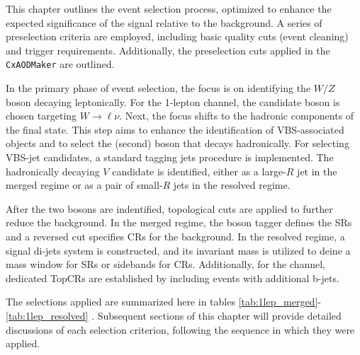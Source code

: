 

This chapter outlines the event selection process, optimized to enhance the expected significance of the signal relative to the background.
A series of preselection criteria are employed, including basic quality cuts (event cleaning) and trigger requirements. Additionally, the preselection cuts applied in the \texttt{CxAODMaker} are outlined.

In the primary phase of event selection, the focus is on identifying the $W/Z$ boson decaying leptonically. For the 1-lepton channel, the candidate boson is chosen targeting $W\to \ell\nu$.
Next, the focus shifts to the hadronic components of the final state. This step aims to enhance the identification of VBS-associated objects and to select the (second) boson that decays hadronically. For selecting VBS-jet candidates, a standard tagging jets procedure is implemented. The hadronically decaying $V$ candidate is identified, either as a large-$R$ jet in the merged regime or as a pair of small-$R$ jets in the resolved regime. 

After the two bosons are indentified, topological cuts are applied to further reduce the background. In the merged regime, the boson tagger defines the SRs and a reversed cut specifies CRs for the \Vjets background. In the resolved regime, a signal di-jets system is constructed, and its invariant mass is utilized to deine a mass window for SRs or sidebands for \Vjets CRs. Additionally, for the \olep channel, dedicated TopCRs are established by including events with additional b-jets.


The selections applied are summarized here in tables
\ref{tab:1lep_merged}-\ref{tab:1lep_resolved}
.
Subsequent sections of this chapter will provide detailed discussions of each selection criterion, following the sequence in which they were applied.

